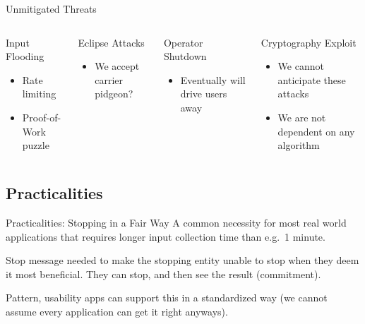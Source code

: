 \begin{frame}{Unmitigated Threats}
    \begin{columns}[T,onlytextwidth]

        \begin{block}{Input Flooding}
          \begin{itemize}
              \item Rate limiting
              \item Proof-of-Work puzzle
          \end{itemize}
        \end{block}

        \begin{block}{Eclipse Attacks}
            \begin{itemize}
                \item We accept carrier pidgeon?
            \end{itemize}
        \end{block}


        \begin{block}{Operator Shutdown}
            \begin{itemize}
                \item Eventually will drive users away
            \end{itemize}
        \end{block}

        \begin{block}{Cryptography Exploit}
            \begin{itemize}
                \item We cannot anticipate these attacks
                \item We are not dependent on any algorithm
            \end{itemize}
        \end{block}

      \end{columns}
\end{frame}

\subsection{Practicalities}

\begin{frame}{Practicalities: Stopping in a Fair Way}
    A common necessity for most real world applications that requires longer input collection time than e.g.\ 1 minute.

    Stop message needed to make the stopping entity unable to stop when they deem it most beneficial. They can stop, and then see the result (commitment).

    Pattern, usability apps can support this in a standardized way (we cannot assume every application can get it right anyways).
\end{frame}

